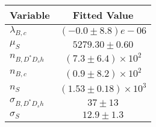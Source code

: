 \begin{tabular}[t]{lc}
\hline
Variable &Fitted Value\\
\hline\hline
$\lambda_{B,c}$&$(-0.0\pm8.8)e-06$\\
\hline
$\mu_S$&$5279.30\pm0.60$\\
\hline
$n_{B, D^* D_s h}$&$(7.3\pm6.4)\times 10^2$\\
\hline
$n_{B,c}$&$(0.9\pm8.2)\times 10^2$\\
\hline
$n_S$&$(1.53\pm0.18)\times 10^3$\\
\hline
$\sigma_{B, D^* D_s h}$&$37\pm13$\\
\hline
$\sigma_S$&$12.9\pm1.3$\\
\hline
\end{tabular}